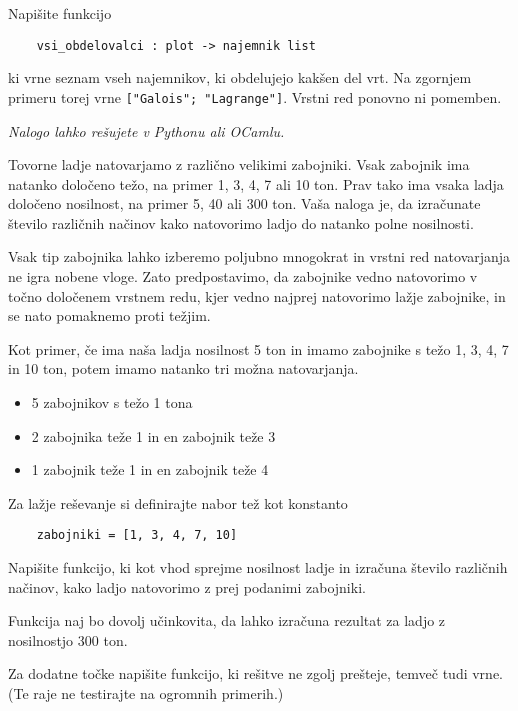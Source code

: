 \documentclass[arhiv]{../izpit}
\begin{document}
\podnaloga
Napišite funkcijo
\begin{verbatim}
    vsi_obdelovalci : plot -> najemnik list
\end{verbatim}
ki vrne seznam vseh najemnikov, ki obdelujejo kakšen del vrt. Na zgornjem primeru torej vrne \verb|["Galois"; "Lagrange"]|. Vrstni red ponovno ni pomemben.

\prostor

\naloga[]
\emph{Nalogo lahko rešujete v Pythonu ali OCamlu.}

\vspace{5mm} Tovorne ladje natovarjamo z različno velikimi zabojniki.
%
Vsak zabojnik ima natanko določeno težo, na primer 1, 3, 4, 7 ali 10 ton.
%
Prav tako ima vsaka ladja določeno nosilnost, na primer 5, 40 ali 300 ton.
%
Vaša naloga je, da izračunate število različnih načinov kako natovorimo ladjo do natanko polne nosilnosti.

Vsak tip zabojnika lahko izberemo poljubno mnogokrat in vrstni red natovarjanja ne igra nobene vloge. Zato predpostavimo, da zabojnike vedno natovorimo v točno določenem vrstnem redu, kjer vedno najprej natovorimo lažje zabojnike, in se nato pomaknemo proti težjim.
%

Kot primer, če ima naša ladja nosilnost 5 ton in imamo zabojnike s težo 1, 3, 4, 7 in 10 ton, potem imamo natanko tri možna natovarjanja.
\begin{itemize}
    \item 5 zabojnikov s težo 1 tona
    \item 2 zabojnika teže 1 in en zabojnik teže 3
    \item 1 zabojnik teže 1 in en zabojnik teže 4
\end{itemize}


Za lažje reševanje si definirajte nabor tež kot konstanto
\begin{verbatim}
    zabojniki = [1, 3, 4, 7, 10]
\end{verbatim}

%
Napišite funkcijo, ki kot vhod sprejme nosilnost ladje in izračuna število različnih načinov, kako ladjo natovorimo z prej podanimi zabojniki.

Funkcija naj bo dovolj učinkovita, da lahko izračuna rezultat za ladjo z nosilnostjo 300 ton.

Za dodatne točke napišite funkcijo, ki rešitve ne zgolj prešteje, temveč tudi vrne. (Te raje ne testirajte na ogromnih primerih.)
\end{document}

